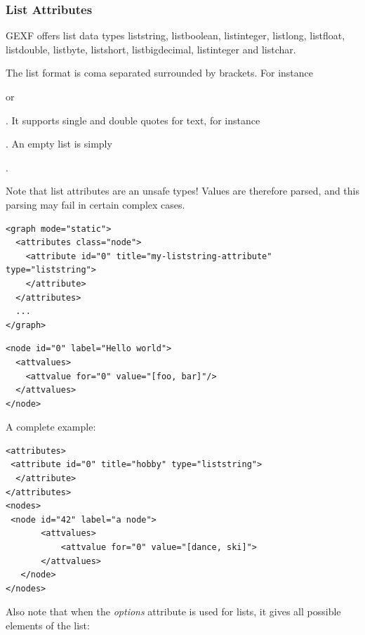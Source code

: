 \documentclass[a4paper,10pt]{article}
\begin{document}
\subsubsection{List Attributes}

GEXF offers list data types liststring, listboolean, listinteger, listlong, listfloat, listdouble, listbyte, listshort, listbigdecimal, listinteger and listchar.

The list format is coma separated surrounded by brackets. For instance \begin{footnotesize}[1, 2, 3]\end{footnotesize} or \begin{footnotesize}\end{footnotesize}. It supports single and double quotes for text, for instance \begin{footnotesize}\end{footnotesize}. An empty list is simply \begin{footnotesize}[]\end{footnotesize}.

Note that list attributes are an unsafe types! Values are therefore parsed, and this parsing may fail in certain complex cases.

\lstset{ style=gexf }
\begin{lstlisting}[caption={Liststring Definition},label=liststringDef]
<graph mode="static">
  <attributes class="node">
    <attribute id="0" title="my-liststring-attribute" type="liststring">
    </attribute>
  </attributes>
  ...
</graph>
\end{lstlisting}

\lstset{ style=gexf }
\begin{lstlisting}[caption={Liststring usage},label=liststringUse]
<node id="0" label="Hello world">
  <attvalues>
    <attvalue for="0" value="[foo, bar]"/>
  </attvalues>
</node>
\end{lstlisting}

A complete example:

\lstset{ style=gexf }
\begin{lstlisting}[caption={Boolean version},label=boolVersion]
<attributes>
 <attribute id="0" title="hobby" type="liststring">
  </attribute>
</attributes>
<nodes>
 <node id="42" label="a node">
       <attvalues>
           <attvalue for="0" value="[dance, ski]">
       </attvalues>
   </node>
</nodes>
\end{lstlisting}

Also note that when the \textit{options} attribute is used for lists, it gives all possible elements of the list:
\end{document}
